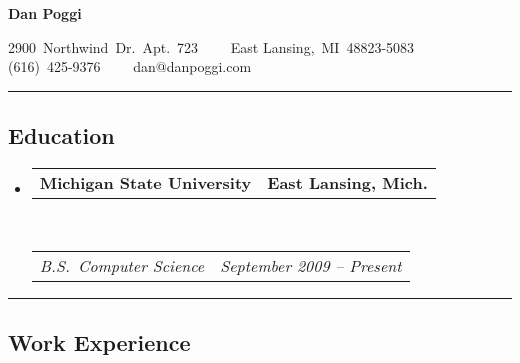 \documentclass[12pt,letterpaper]{article}
\makeatletter
\newcommand{\floatcols}[2]
{\begin{tabular*}{\linewidth}{l@{\extracolsep{\fill}}r}
  #1 &
  #2 \\
\end{tabular*}}
\newcommand{\headercols}[3]
{\begin{tabular*}{\linewidth}{l c r}
  #1 &
  #2 &
  #3 \\
\end{tabular*}}
\makeatother
\begin{document}
\begin{center}
{\LARGE \textbf{Dan Poggi}}

2900~Northwind~Dr.~Apt.~723\ \ \textbullet
\ \ East Lansing,~MI~48823-5083
\\
(616)~425-9376\ \ \textbullet
\ \ dan@danpoggi.com
\end{center}


\hrule
\vspace{-0.4em}
\subsection*{Education}

\begin{itemize}
  \parskip=0.1em

  \item 
    \floatcols
      {\textbf{Michigan State University}}
      {\textbf{East Lansing, Mich.}}
    \\
    \floatcols
      {\emph{B.S.~Computer Science}}
      {\emph{September 2009 -- Present}}
\end{itemize}


\hrule
\vspace{-0.4em}
\subsection*{Work Experience}
\end{document}
